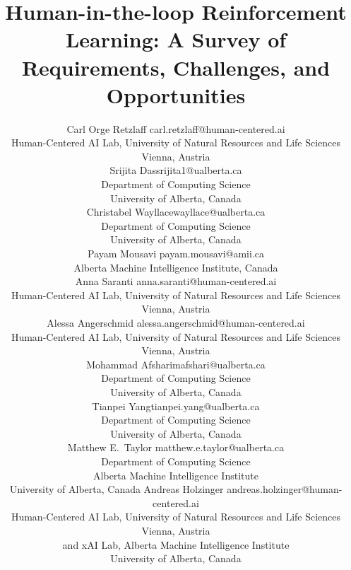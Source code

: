 \documentclass[twoside,11pt]{article}
\begin{document}
\title{Human-in-the-loop Reinforcement Learning: A Survey of Requirements, Challenges, and Opportunities}

\author{\name Carl Orge Retzlaff \email carl.retzlaff@human-centered.ai\\ 
\addr Human-Centered AI Lab, University of Natural Resources and Life Sciences Vienna, Austria\\
\AND
\name Srijita Das\email srijita1@ualberta.ca \\
\addr Department of Computing Science \\ 
University of Alberta, Canada\\
\AND
\name Christabel Wayllace\email wayllace@ualberta.ca \\
\addr Department of Computing Science \\ University of Alberta, Canada\\
\AND
\name Payam Mousavi \email payam.mousavi@amii.ca \\
\addr Alberta Machine Intelligence Institute, Canada\\
\AND
\name Anna Saranti \email anna.saranti@human-centered.ai \\
\addr Human-Centered AI Lab, University of Natural Resources and Life Sciences Vienna, Austria\\
\AND
\name Alessa Angerschmid \email alessa.angerschmid@human-centered.ai \\
\addr Human-Centered AI Lab, University of Natural Resources and Life Sciences Vienna, Austria\\
\AND
\name Mohammad Afshari\email mafshari@ualberta.ca \\
\addr Department of Computing Science \\ University of Alberta, Canada\\
\AND
\name Tianpei Yang\email tianpei.yang@ualberta.ca \\
\addr Department of Computing Science \\ University of Alberta, Canada\\
\AND
\name Matthew E.~Taylor \email matthew.e.taylor@ualberta.ca \\
\addr Department of Computing Science\\
Alberta Machine Intelligence Institute\\
University of Alberta, Canada
\AND
\name Andreas Holzinger \email andreas.holzinger@human-centered.ai \\
\addr Human-Centered AI Lab, University of Natural Resources and Life Sciences Vienna, Austria \\
and xAI Lab, Alberta Machine Intelligence Institute\\
University of Alberta, Canada
}
\end{document}

